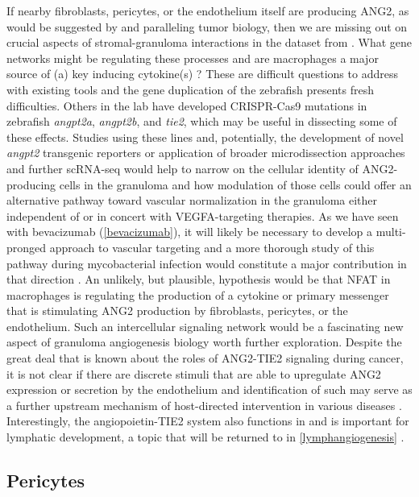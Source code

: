 If nearby fibroblasts, pericytes, or the endothelium itself are producing ANG2, as would be suggested by \citet{Gideon2022} and paralleling tumor biology, then we are missing out on crucial aspects of stromal\hyp{}granuloma interactions in the dataset from \citet{Cronan2021}. What gene networks might be regulating these processes and are macrophages a major source of (a) key inducing cytokine(s) \citep{Augustin2009}? These are difficult questions to address with existing tools and the gene duplication of the zebrafish presents fresh difficulties. Others in the lab have developed CRISPR\hyp{}Cas9 mutations in zebrafish \textit{angpt2a}, \textit{angpt2b}, and \textit{tie2}, which may be useful in dissecting some of these effects. Studies using these lines and, potentially, the development of novel \textit{angpt2} transgenic reporters or application of broader microdissection approaches and further scRNA\hyp{}seq would help to narrow on the cellular identity of ANG2\hyp{}producing cells in the granuloma and how modulation of those cells could offer an alternative pathway toward vascular normalization in the granuloma either independent of or in concert with VEGFA\hyp{}targeting therapies. As we have seen with bevacizumab (\autoref{bevacizumab}), it will likely be necessary to develop a multi\hyp{}pronged approach to vascular targeting and a more thorough study of this pathway during mycobacterial infection would constitute a major contribution in that direction \citep{Huang2010, Saharinen2017}. An unlikely, but plausible, hypothesis would be that NFAT in macrophages is regulating the production of a cytokine or primary messenger that is stimulating ANG2 production by fibroblasts, pericytes, or the endothelium. Such an intercellular signaling network would be a fascinating new aspect of granuloma angiogenesis biology worth further exploration. Despite the great deal that is known about the roles of ANG2\hyp{}TIE2 signaling during cancer, it is not clear if there are discrete stimuli that are able to upregulate ANG2 expression or secretion by the endothelium and identification of such may serve as a further upstream mechanism of host\hyp{}directed intervention in various diseases \citep{Huang2010}. Interestingly, the angiopoietin\hyp{}TIE2 system also functions in and is important for lymphatic development, a topic that will be returned to in \autoref{lymphangiogenesis} \citep{Eklund2017}.

\subsection{Pericytes}\label{pericytes}

